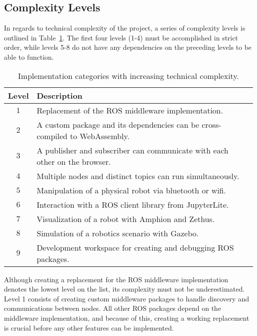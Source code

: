 
    \subsection{Complexity Levels}

        In regards to technical complexity of the project, a series of complexity levels is outlined in Table~\ref{tab:techlevels}. The first four levels (1-4) must be accomplished in strict order, while levels 5-8 do not have any dependencies on the preceding levels to be able to function.        

        \begin{table}[htbp]
            \color{textColor}
            \centering	
            \caption{Implementation categories with increasing technical complexity.}
                \begin{tabular}{cl}
                    \toprule
                    \textbf{Level} & \textbf{Description} \\
                    \midrule
                    $1$ & Replacement of the \ac{ROS} middleware implementation. \\ [0.3em]
                    $2$ & A custom package and its dependencies can be cross-compiled to WebAssembly. \\[0.3em]
                    $3$ & A publisher and subscriber can communicate with each other on the browser.\\[0.3em]
                    $4$ & Multiple nodes and distinct topics can run simultaneously. \\[0.3em]
                    $5$ & Manipulation of a physical robot via bluetooth or wifi. \\[0.3em]
                    $6$ & Interaction with a ROS client library from JupyterLite. \\[0.3em]
                    $7$ & Visualization of a robot with Amphion and Zethus. \\[0.3em]
                    $8$ & Simulation of a robotics scenario with Gazebo. \\[0.3em]
                    $9$ & Development workspace for creating and debugging ROS packages. \\
                \bottomrule
            \end{tabular}\label{tab:techlevels}
        \end{table}

        Although creating a replacement for the \ac{ROS} middleware implementation denotes the lowest level on the list, its complexity must not be underestimated. Level 1 consists of creating custom middleware packages to handle discovery and communications between nodes. All other \ac{ROS} packages depend on the middleware implementation, and because of this, creating a working replacement is crucial before any other features can be implemented.

